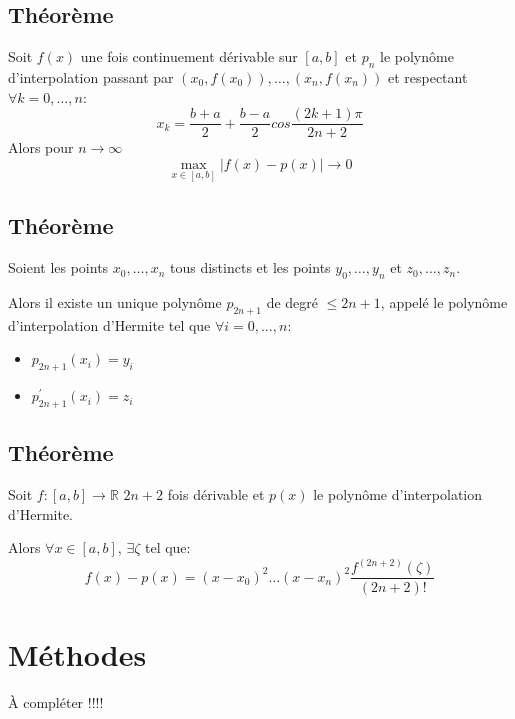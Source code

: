 \documentclass{article}
\newcommand{\R}{\mathbb{R}}
\begin{document}
\subsection{Théorème}
Soit $f(x)$ une fois continuement dérivable sur $[a,b]$ et $p_n$ le polynôme d'interpolation passant par $(x_0, f(x_0)), \dots, (x_n, f(x_n))$
et respectant $\forall k = 0, \dots, n$:
$$x_k = \frac{b + a}{2} + \frac{b - a}{2}cos\frac{(2k + 1)\pi}{2n + 2}$$
Alors pour $ n \rightarrow \infty$
$$\max_{x \in [a,b]}|f(x) - p(x)| \rightarrow 0$$

\subsection{Théorème}
Soient les points $x_0, \dots, x_n$ tous distincts et les points $y_0, \dots, y_n$ et $z_0, \dots, z_n$.

Alors il existe un unique polynôme $p_{2n + 1}$ de degré $\leq 2n + 1$, appelé le polynôme d'interpolation d'Hermite tel que $\forall i = 0, \dots, n$:
\begin{itemize}
    \item $p_{2n + 1}(x_i)  = y_i$
    \item $p_{2n + 1 }^{'}(x_i) = z_i$
\end{itemize}

\subsection{Théorème}
Soit $f: [a, b] \rightarrow \R$ $2n + 2$ fois dérivable et $p(x)$ le polynôme d'interpolation d'Hermite.

Alors $\forall x \in [a, b]$, $\exists \zeta $ tel que:
$$f(x) - p(x) = (x - x_0)^2\dots(x - x_n)^2 \frac{f^{(2n + 2)}(\zeta)}{(2n + 2)!}$$

\section{Méthodes}
À compléter !!!!
\end{document}
